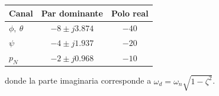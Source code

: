 \documentclass[11pt,a4paper]{article}
\begin{document}
\begin{center}
\begin{tabular}{lcc}
\toprule
Canal & Par dominante & Polo real \\
\midrule
$\phi,\ \theta$ & $-8 \pm j3.874$ & $-40$ \\
$\psi$          & $-4 \pm j1.937$ & $-20$ \\
$p_N$           & $-2 \pm j0.968$ & $-10$ \\
\bottomrule
\end{tabular}
\end{center}

\noindent
donde la parte imaginaria corresponde a
$\omega_d=\omega_n\sqrt{1-\zeta^{2}}$.
\end{document}
